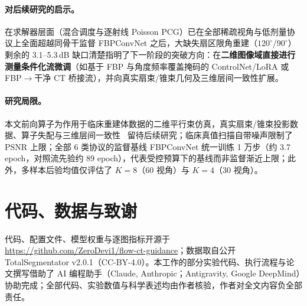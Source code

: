 \documentclass[11pt,UTF8]{ctexart}
\begin{document}
\paragraph{对后续研究的启示。}
在求解器层面（混合调度与逐射线 Poisson PCG）已在全部稀疏视角与低剂量协议上全面超越同骨干监督 FBPConvNet 之后，大缺失扇区限角重建（$120^\circ$/$90^\circ$）剩余的 3.1--5.3\,dB 缺口清楚指明了下一阶段的突破方向：在\textbf{二维图像域直接进行测量条件化流微调}（如基于 FBP 与角度频率覆盖掩码的 ControlNet/LoRA 或 FBP$\to$干净 CT 桥接流），并向真实扇束/锥束几何及三维层间一致性扩展。

\paragraph{研究局限。}
本文前向算子为作用于临床重建体数据的二维平行束仿真，真实扇束/锥束投影数据、算子失配与三维层间一致性~\cite{chung2023diffusionmbir,song2024diffusionblend} 留待后续研究；临床真值扫描自带噪声限制了 PSNR 上限；全部 6 类协议的监督基线 FBPConvNet 统一训练 1 万步（约 3.7 epoch，对照流先验约 89 epoch），代表受控预算下的基线而非监督渐近上限；此外，多样本后验均值仅评估了 $K{=}8$（60 视角）与 $K{=}4$（30 视角）。

\section*{代码、数据与致谢}
代码、配置文件、模型权重与逐图指标开源于 \url{https://github.com/ZeroDevi1/flow-ct-guidance}；数据取自公开 TotalSegmentator v2.0.1（CC-BY-4.0）。本工作的部分实验代码、执行流程与论文撰写借助了 AI 编程助手（Claude, Anthropic；Antigravity, Google DeepMind）协助完成；全部代码、实验数值与科学表述均由作者核验，作者对全文内容负全部责任。

\FloatBarrier
\appendix
\end{document}
